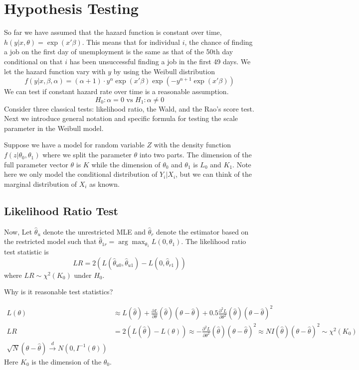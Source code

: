 \documentclass[11pt, a4paper, oneside]{article}
\theoremstyle{definition}
\theoremstyle{proposition}
\theoremstyle{corollary}
\theoremstyle{lemma}
\theoremstyle{theorem}
\begin{document}
\section{Hypothesis Testing}
So far we have assumed that the hazard function is constant over time, $h(y|x, \theta) = \exp(x'\beta)$. This means that for individual $i$, the chance of finding a job on the first day of unemployment is the same as that of the 50th day conditional on that $i$ has been unsuccessful finding a job in the first 49 days. We let the hazard function vary with $y$ by using the Weibull distribution
$$f(y|x, \beta, \alpha) = (\alpha + 1)\cdot y^{\alpha}\exp(x'\beta)\exp(-y^{\alpha+1}\exp(x'\beta))$$
We can test if constant hazard rate over time is a reasonable assumption.
$$H_0: \alpha=0\text{ vs } H_1: \alpha\neq0$$
Consider three classical tests: likelihood ratio, the Wald, and the Rao's score test. Next we introduce general notation and specific formula for testing the scale parameter in the Weibull model. 

Suppose we have a model for random variable $Z$ with the density function $f(z| \theta_0, \theta_1)$ where we split the parameter $\theta$ into two parts. 
The dimension of the full parameter vector $\theta$ is $K$ while the dimension of $\theta_0$ and $\theta_1$ is $L_0$ and $K_1$. Note here we only model the conditional distribution of $Y_i|X_i$, but we can think of the marginal distribution of $X_i$ as known. 

\subsection{Likelihood Ratio Test}

Now, Let $\hat{\theta}_u$ denote the unrestricted MLE and $\hat{\theta}_r$ denote the estimator based on the restricted model such that $\hat{\theta}_{1r} = \arg \max_{\theta_1}L(0, \theta_1)$. The likelihood ratio test statistic is $$LR = 2(L(\hat{\theta}_{u0}, \hat{\theta}_{u1}) - L(0, \hat{\theta}_{r1}))$$ where $LR\sim \chi^2(K_0)$ under $H_0$. 

Why is it reasonable test statistics?

\begin{align*}
L(\theta) &\approx L(\hat{\theta}) + \frac{\partial L}{\partial \theta}(\hat{\theta})(\theta - \hat{\theta})+0.5\frac{\partial^2 L}{\partial \theta^2}(\hat{\theta})(\theta - \hat{\theta})^2 \\
LR & = 2(L(\hat{\theta}) - L(\theta)) \approx -\frac{\partial^2 L}{\partial \theta^2}(\hat{\theta})(\theta - \hat{\theta})^2 \approx NI(\hat{\theta})(\theta - \hat{\theta})^2 \sim \chi^2(K_0)\\
\sqrt{N}(\theta- \hat{\theta}) \overset{d}{\to} N(0, I^{-1}(\theta))
\end{align*}
Here $K_0$ is the dimension of the $\theta_0$. 
\end{document}
